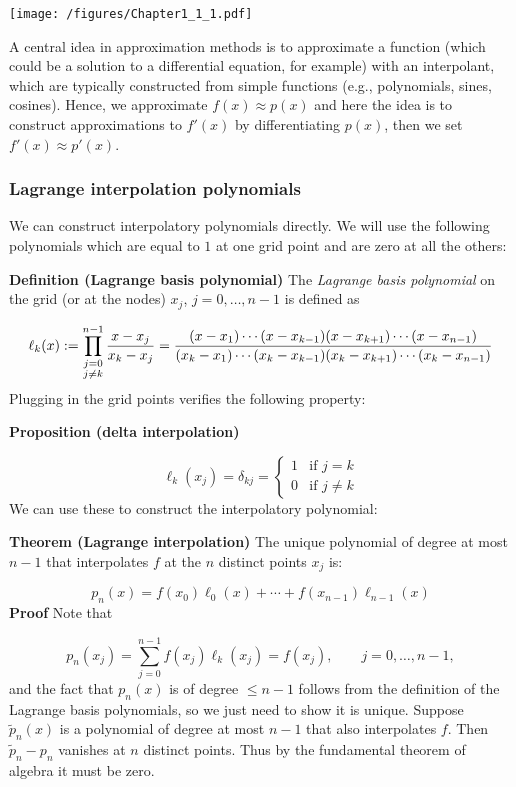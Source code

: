 \documentclass[12pt,a4paper]{article}
\begin{document}
\texttt{[image: /figures/Chapter1\_1\_1.pdf]}

A central idea in approximation methods is to approximate a function (which could be a solution to a differential equation, for example) with an interpolant, which are typically constructed from simple functions (e.g., polynomials, sines, cosines).  Hence, we approximate $f(x) \approx p(x)$ and here the idea is to  construct approximations to $f'(x)$ by differentiating $p(x)$, then we set $f'(x) \approx p'(x)$.

\subsubsection{Lagrange interpolation polynomials}
We can construct interpolatory polynomials directly. We will use the following polynomials which are equal to $1$ at one grid point and are zero at all the others:

\textbf{Definition (Lagrange basis polynomial)} The \emph{Lagrange basis polynomial} on the grid (or at the nodes)  $x_{j}$, $j = 0, \ldots, n-1$  is defined as

\[
\ensuremath{\ell}_k(x) := \prod_{\substack{j = 0 \\ j \neq k}}^{n-1} {x-x_j \over x_k - x_j} =  {(x-x_1) \ensuremath{\cdots}(x-x_{k-1})(x-x_{k+1}) \ensuremath{\cdots} (x-x_{n-1}) \over (x_k - x_1) \ensuremath{\cdots} (x_k - x_{k-1}) (x_k - x_{k+1}) \ensuremath{\cdots} (x_k - x_{n-1})}
\]
Plugging in the grid points verifies the following property:

\textbf{Proposition (delta interpolation)}

\[
\ensuremath{\ell}_k(x_j) = \ensuremath{\delta}_{kj} = \begin{cases}
1 & \text{if } j = k \\
0 & \text{if } j \neq k
\end{cases}
\]
We can use these to construct the interpolatory polynomial:

\textbf{Theorem (Lagrange interpolation)} The unique  polynomial of degree at most $n-1$ that interpolates $f$ at the $n$ distinct points $x_j$ is:

\[
p_n(x) = f(x_0) \ensuremath{\ell}_0(x) + \ensuremath{\cdots} + f(x_{n-1}) \ensuremath{\ell}_{n-1}(x)
\]
\textbf{Proof} Note that

\[
p_n(x_j) = \sum_{j=0}^{n-1} f(x_j) \ensuremath{\ell}_k(x_j) = f(x_j), \qquad j = 0, \ldots, n-1,
\]
and the fact that $p_n(x)$ is of degree $\leq n-1$ follows from the definition of the Lagrange basis polynomials, so we just need to show it is unique. Suppose $\tilde{p}_n(x)$ is a  polynomial of degree at most $n-1$ that also interpolates $f$. Then $\tilde{p}_n - p_n$ vanishes at $n$ distinct points. Thus by the fundamental theorem of algebra it must be zero.
\end{document}
